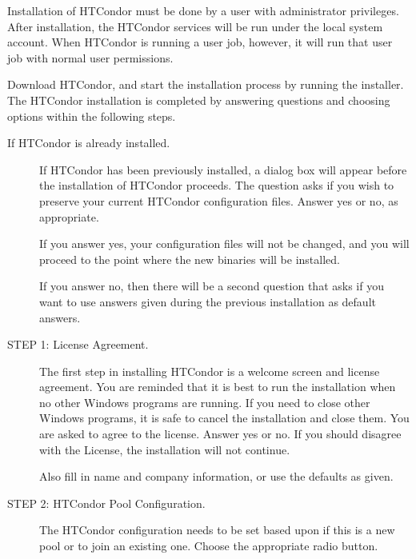 % 

Installation of HTCondor must be done by a user with administrator privileges.
After installation, the HTCondor services will be run under 
the local system account.
When HTCondor is running a user job, however, 
it will run that user job with normal user permissions.

Download HTCondor, and start the installation process by running the installer. 
The HTCondor installation is completed by answering questions 
and choosing options within the following steps.

\begin{description}
\item[If HTCondor is already installed.]

     If HTCondor has been previously installed,
     a dialog box will appear before the installation of HTCondor proceeds.
     The question asks if you wish to preserve your current
     HTCondor configuration files.
     Answer yes or no, as appropriate.
	 
     If you answer yes, your configuration files will not be changed, 
     and you will proceed to the point where the new binaries will be installed.

     If you answer no, then there will be a second question
     that asks if you want to use answers
     given during the previous installation
     as default answers.

\item[STEP 1: License Agreement.]

     The first step in installing HTCondor
     is a welcome screen and license agreement.
     You are reminded that it is best to run the installation
     when no other Windows programs are running.
     If you need to close other Windows programs, it is safe to cancel the
     installation and close them.
     You are asked to agree to the license.
     Answer yes or no.  If you should disagree with the License, the
     installation will not continue.

     Also fill in name and company information,
     or use the defaults as given.

\item[STEP 2: HTCondor Pool Configuration.]

     The HTCondor configuration needs to be set based upon
     if this is a new pool or to join an existing one.
     Choose the appropriate radio button.


\end{description}
